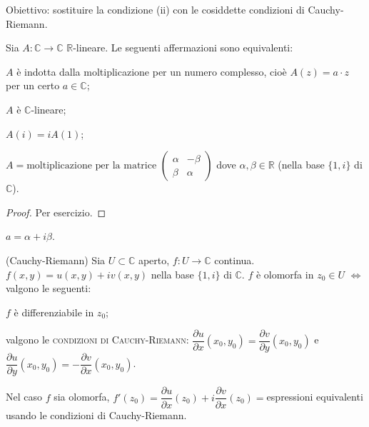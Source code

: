 Obiettivo: sostituire la condizione (ii) con le cosiddette condizioni di Cauchy-Riemann.

\begin{lm} \label{c-lineare}
  Sia $A: \mathbb{C} \longrightarrow \mathbb{C}$ $\mathbb{R}$-lineare. Le seguenti affermazioni sono equivalenti:
  \begin{nlist}
    \item $A$ è indotta dalla moltiplicazione per un numero complesso, cioè $A(z)=a \cdot z$ per un certo $a \in \mathbb{C}$;
    \item $A$ è $\mathbb{C}$-lineare;
    \item $A(i)=iA(1)$;
    \item $A=\text{moltiplicazione per la matrice }\begin{pmatrix}
      \alpha & -\beta\\
      \beta & \alpha
  \end{pmatrix}$ dove $\alpha, \beta \in \mathbb{R}$ (nella base $\{1, i\}$ di $\mathbb{C}$).
  \end{nlist}
\end{lm}

\begin{proof}
  Per esercizio.
\end{proof}

\begin{oss}
  $a=\alpha+i\beta$.
\end{oss}

\begin{thm}
  (Cauchy-Riemann) Sia $U \subset \mathbb{C}$ aperto, $f:U \longrightarrow \mathbb{C}$ continua. $f(x, y)=u(x, y)+iv(x, y)$ nella base $\{1, i\}$ di $\mathbb{C}$. $f$ è olomorfa in $z_0 \in U$ $\iff$ valgono le seguenti:
  \begin{nlist}
    \item $f$ è differenziabile in $z_0$;
    \item valgono le \textsc{condizioni di Cauchy-Riemann}: $\dfrac{\partial u}{\partial x}(x_0, y_0)=\dfrac{\partial v}{\partial y}(x_0, y_0)$ e $\dfrac{\partial u}{\partial y}(x_0, y_0)=-\dfrac{\partial v}{\partial x}(x_0, y_0)$.
  \end{nlist}
  Nel caso $f$ sia olomorfa, $f'(z_0)=\dfrac{\partial u}{\partial x}(z_0)+i\dfrac{\partial v}{\partial x}(z_0)=$espressioni equivalenti usando le condizioni di Cauchy-Riemann.
\end{thm}

